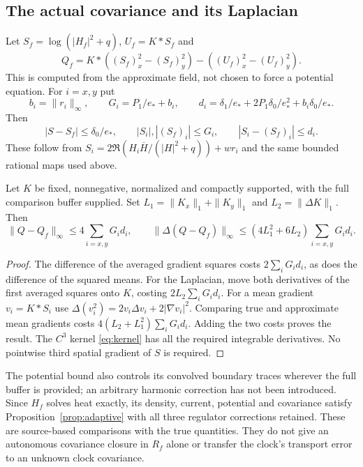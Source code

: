 \subsection{The actual covariance and its Laplacian}
Let $S_f=\log(|H_f|^2+q)$, $U_f=K*S_f$ and
\[
 Q_f=K*((S_f)_x^2-(S_f)_y^2)-((U_f)_x^2-(U_f)_y^2).
\]
This is computed from the approximate field, not chosen to force a
potential equation. For $i=x,y$ put
\begin{equation}
 b_i=\|r_i\|_\infty,\qquad
 G_i=P_1/e_*+b_i,\qquad
 d_i=\delta_1/e_*+2P_1\delta_0/e_*^2+b_i\delta_0/e_*.
 \label{eq:gradientstability}
\end{equation}
Then
\[
 |S-S_f|\le\delta_0/e_*,\qquad
 |S_i|,|(S_f)_i|\le G_i,\qquad |S_i-(S_f)_i|\le d_i.
\]
These follow from
$S_i=2\Re(H_i\overline H/(|H|^2+q))+wr_i$ and the same bounded
rational maps used above.

\begin{theorem}\label{thm:covariance}
Let $K$ be fixed, nonnegative, normalized and compactly supported,
with the full comparison buffer supplied. Set
$L_1=\|K_x\|_1+\|K_y\|_1$ and $L_2=\|\Delta K\|_1$.
Then
\begin{equation}
 \|Q-Q_f\|_\infty\le4\sum_{i=x,y}G_i d_i,\qquad
 \|\Delta(Q-Q_f)\|_\infty
       \le(4L_1^2+6L_2)\sum_{i=x,y}G_i d_i.
 \label{eq:covariancestability}
\end{equation}
\end{theorem}
\begin{proof}
The difference of the averaged gradient squares costs
$2\sum_iG_i d_i$, as does the difference of the squared means.
For the Laplacian, move both derivatives of the first averaged squares
onto $K$, costing $2L_2\sum_iG_i d_i$.
For a mean gradient $v_i=K*S_i$ use
$\Delta(v_i^2)=2v_i\Delta v_i+2|\nabla v_i|^2$.
Comparing true and approximate mean gradients costs
$4(L_2+L_1^2)\sum_iG_i d_i$. Adding the two costs proves the result.
The $C^3$ kernel \eqref{eq:kernel} has all the required integrable
derivatives. No pointwise third spatial gradient of $S$ is required.
\end{proof}
The potential bound also controls its convolved boundary traces wherever
the full buffer is provided; an arbitrary harmonic correction has not
been introduced. Since $H_f$ solves heat exactly, its density, current,
potential and covariance satisfy Proposition~\ref{prop:adaptive} with
all three regulator corrections retained.
These are source-based comparisons with the true quantities. They do
not give an autonomous covariance closure in $R_f$ alone or transfer
the clock's transport error to an unknown clock covariance.

